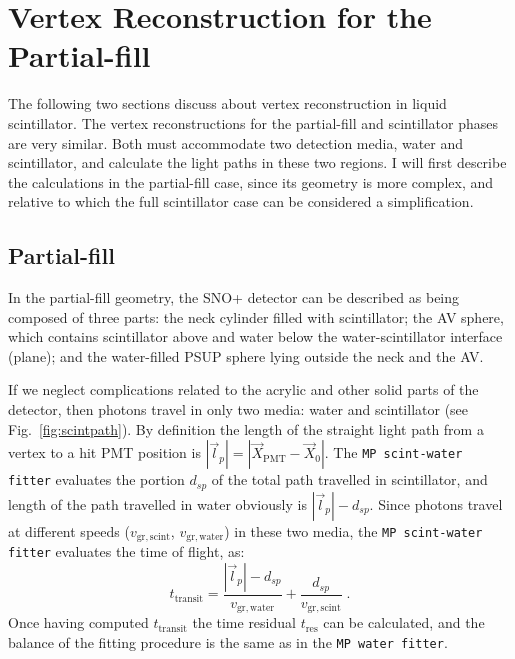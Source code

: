 \section{Vertex Reconstruction for the Partial-fill}\label{sect:partialFitter}

The following two sections discuss about vertex reconstruction in liquid scintillator. The vertex reconstructions for the partial-fill and scintillator phases are very similar. Both must accommodate two detection media, water and scintillator, and calculate the light paths in these two regions. I will first describe the calculations in the partial-fill case, since its geometry is more complex, and relative to which the full scintillator case can be considered a simplification.

\subsection{Partial-fill}

In the partial-fill geometry, the SNO+ detector can be described as being composed of three parts: the neck cylinder filled with scintillator; the AV sphere, which contains scintillator above and water below the water-scintillator interface (plane); and the water-filled PSUP sphere lying outside the neck and the AV.

If we neglect complications related to the acrylic and other solid parts of the detector, then photons travel in only two media: water and scintillator (see Fig.~\ref{fig:scintpath}). By definition the length of the straight light path from a vertex to a hit PMT position is $|\vec{l}_p|=|\vec{X}_\mathrm{PMT}-\vec{X}_0|$. The \texttt{MP scint-water fitter} evaluates the portion $d_{sp}$ of the total path travelled in scintillator, and length of the path travelled in water obviously is $|\vec{l}_p|-d_{sp}$. Since photons travel at different speeds ($v_\mathrm{gr,scint}$, $v_\mathrm{gr,water}$) in these two media, the \texttt{MP scint-water fitter} evaluates the time of flight, as:
\begin{equation}
t_{\mathrm{transit}} = \frac{|\vec{l}_p|-d_{sp}}{v_\mathrm{gr,water}} +\frac{d_{sp}}{v_\mathrm{gr,scint}} \; .
\end{equation}
Once having computed $t_{\mathrm{transit}}$ the time residual $t_\mathrm{res}$ can be calculated, and the balance of the fitting procedure is the same as in the \texttt{MP water fitter}.

